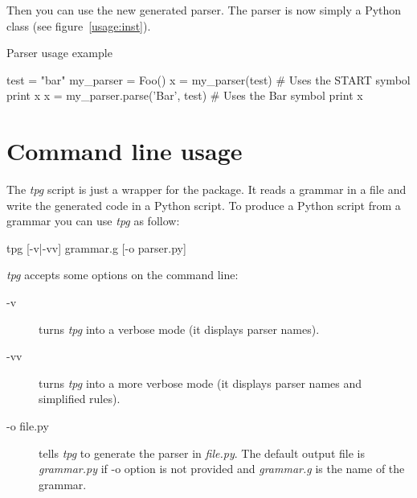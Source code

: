 Then you can use the new generated parser. The parser is now simply a Python class (see figure~\ref{usage:inst}).

\begin{code}
\caption{Parser usage example}								\label{usage:inst}
\begin{verbatimtab}[4]
	test = "bar"
	my_parser = Foo()
	x = my_parser(test)               # Uses the START symbol
	print x
	x = my_parser.parse('Bar', test)  # Uses the Bar symbol
	print x
\end{verbatimtab}
\end{code}

\section{Command line usage}

The \emph{tpg} script is just a wrapper for the package.
It reads a grammar in a file and write the generated code in a Python script.
To produce a Python script from a grammar you can use \emph{tpg} as follow:

\begin{verbatimtab}[4]
	tpg [-v|-vv] grammar.g [-o parser.py]
\end{verbatimtab}

\emph{tpg} accepts some options on the command line:

\begin{description}
	\item [-v] turns \emph{tpg} into a verbose mode (it displays parser names).
	\item [-vv] turns \emph{tpg} into a more verbose mode (it displays parser names and simplified rules).
	\item [-o file.py] tells \emph{tpg} to generate the parser in \emph{file.py}. The default output file is \emph{grammar.py} if -o option is not provided and \emph{grammar.g} is the name of the grammar.
\end{description}
